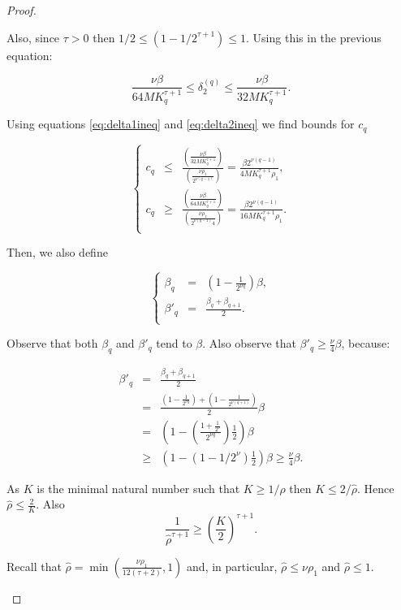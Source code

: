 \begin{proof}
\begin{enumerate}
Also, since $\tau > 0$ then $1/2 \leq (1 - 1/2^{\tau+1}) \leq 1$. Using this in the previous equation:

\begin{equation}\label{eq:delta2ineq}
\frac{\nu \beta}{64 M K_q^{\tau+1}}\leq \delta_2^{(q)} \leq \frac{\nu \beta}{32 M K_q^{\tau+1}}.
\end{equation}

Using equations \ref{eq:delta1ineq} and \ref{eq:delta2ineq} we find bounds for $c_q$

$$
\left\{
\begin{array}{rcl}
c_q & \leq & \frac{\left(\frac{\nu \beta}{32 M K_q^{\tau+1}}\right)}{\left(\frac{\nu \rho_1}{2^{\nu(q-1)}}\right)} = \frac{\beta 2^{\nu(q-1)}}{4 M K_q^{\tau+1}\rho_1},\\
c_q & \geq & \frac{\left(\frac{\nu \beta}{64 M K_q^{\tau+1}}\right)}{\left(\frac{\nu \rho_1}{2^{\nu(q-1)} 4}\right)} = \frac{\beta 2^{\nu(q-1)}}{16 M K_q^{\tau+1}\rho_1}.\\
\end{array}
\right.
$$

Then, we also define

$$
\left\{
\begin{array}{rcl}
\beta_q & = & (1-\frac{1}{2^{\nu q}})\beta,\\
\beta'_q & = & \frac{\beta_q + \beta_{q+1}}{2}.\\
\end{array}
\right.
$$

Observe that both $\beta_q$ and $\beta'_q$ tend to $\beta$. Also observe that $\beta'_q \geq \frac{\nu}{4}\beta$, because:

$$
\begin{array}{rcl}
\beta'_q & = & \frac{\beta_q + \beta_{q+1}}{2} \\
& = & \frac{\left(1 - \frac{1}{2^{\nu q}}\right) + \left(1 - \frac{1}{2^{\nu(q+1)}}\right)}{2}\beta \\
& = & \left(1 - \left(\frac{1 + \frac{1}{2^\nu}}{2^{\nu q}}\right)\frac{1}{2}\right)\beta \\
& \geq & \left(1 - (1 - 1/2^\nu)\frac{1}{2}\right)\beta \geq  \frac{\nu}{4}\beta.
\end{array}
$$

As $K$ is the minimal natural number such that $K \geq 1/\hat\rho$ then $K \leq 2/\hat \rho$. Hence $\hat\rho \leq \frac{2}{K}$. Also $$\frac{1}{\hat\rho^{\tau+1}} \geq \left(\frac{K}{2}\right)^{\tau+1}.$$

Recall that $\hat \rho = \min(\frac{\nu \rho_1}{12(\tau+2)},1)$ and, in particular, $\hat \rho \leq \nu\rho_1$ and $\hat \rho \leq 1$.


\end{enumerate}
\end{proof}
